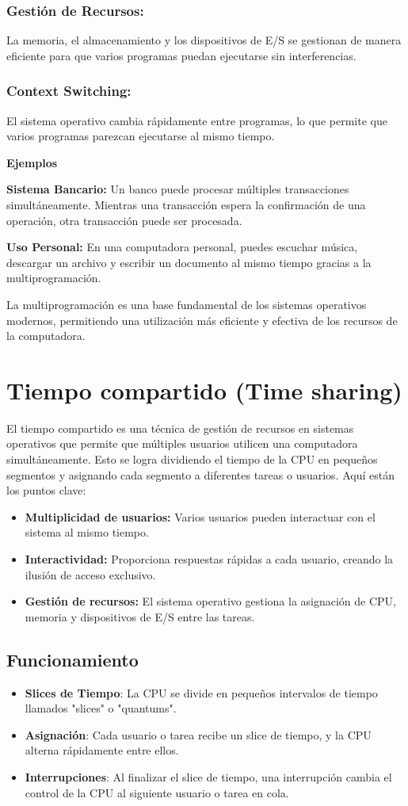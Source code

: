 \subsubsection{Gestión de Recursos:} La memoria, el almacenamiento y los dispositivos de E/S se gestionan de manera eficiente para que varios programas puedan ejecutarse sin interferencias.
\subsubsection{Context Switching:} El sistema operativo cambia rápidamente entre programas, lo que permite que varios programas parezcan ejecutarse al mismo tiempo.

\textbf{Ejemplos}

\textbf{Sistema Bancario:} Un banco puede procesar múltiples transacciones simultáneamente. Mientras una transacción espera la confirmación de una operación, otra transacción puede ser procesada.

\textbf{Uso Personal:} En una computadora personal, puedes escuchar música, descargar un archivo y escribir un documento al mismo tiempo gracias a la multiprogramación.

La multiprogramación es una base fundamental de los sistemas operativos modernos, permitiendo una utilización más eficiente y efectiva de los recursos de la computadora.

\section{Tiempo compartido (Time sharing)}
El tiempo compartido es una técnica de gestión de recursos en sistemas operativos que permite que múltiples usuarios utilicen una computadora simultáneamente. Esto se logra dividiendo el tiempo de la CPU en pequeños segmentos y asignando cada segmento a diferentes tareas o usuarios. Aquí están los puntos clave:
\begin{itemize}
	\item \textbf{Multiplicidad de usuarios:}  Varios usuarios pueden interactuar con el sistema al mismo tiempo.
	\item \textbf{Interactividad:}  Proporciona respuestas rápidas a cada usuario, creando la ilusión de acceso exclusivo.
	\item  \textbf{Gestión de recursos:} El sistema operativo gestiona la asignación de CPU, memoria y dispositivos de E/S entre las tareas.
\end{itemize}
\subsection{Funcionamiento}
\begin{itemize}
	\item \textbf{Slices de Tiempo}: La CPU se divide en pequeños intervalos de tiempo llamados "slices" o "quantums".
	\item \textbf{Asignación}: Cada usuario o tarea recibe un slice de tiempo, y la CPU alterna rápidamente entre ellos.
	\item \textbf{Interrupciones}: Al finalizar el slice de tiempo, una interrupción cambia el control de la CPU al siguiente usuario o tarea en cola.
\end{itemize}

